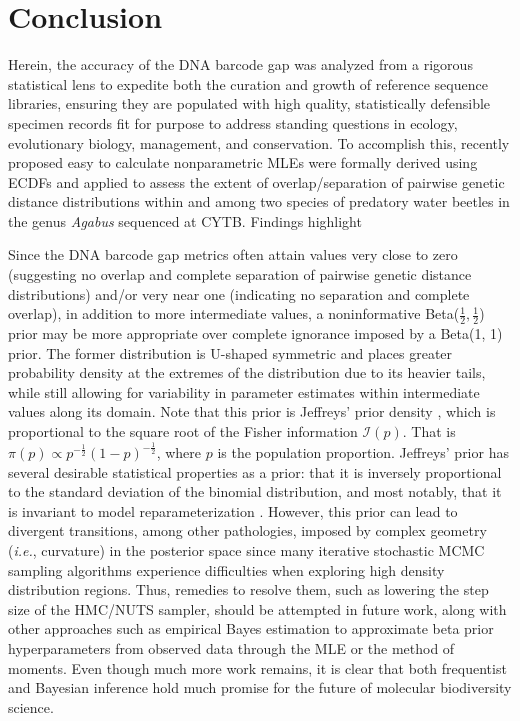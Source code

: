 \documentclass[12pt]{article}
\begin{document}
\section{Conclusion}

Herein, the accuracy of the DNA barcode gap was analyzed from a rigorous statistical lens to expedite both the curation and growth of reference sequence libraries, ensuring they are populated with high quality, statistically defensible specimen records fit for purpose to address standing questions in ecology, evolutionary biology, management, and conservation. To accomplish this, recently proposed easy to calculate nonparametric MLEs were formally derived using ECDFs and applied to assess the extent of overlap/separation of pairwise genetic distance distributions within and among two species of predatory water beetles in the genus \textit{Agabus} sequenced at CYTB. Findings highlight 

Since the DNA barcode gap metrics often attain values very close to zero (suggesting no overlap and complete separation of pairwise genetic distance distributions) and/or very near one (indicating no separation and complete overlap), in addition to more intermediate values, a noninformative Beta($\frac{1}{2}, \frac{1}{2}$) prior may be more appropriate over complete ignorance imposed by a Beta(1, 1) prior. The former distribution is U-shaped symmetric and places greater probability density at the extremes of the distribution due to its heavier tails, while still allowing for variability in parameter estimates within intermediate values along its domain. Note that this prior is Jeffreys' prior density \citep{jeffreys1946invariant}, which is  proportional to the square root of the Fisher information $\mathcal{I}(p)$. That is
$\pi(p) \propto p^{-\frac{1}{2}}(1-p)^{-\frac{1}{2}}$, where $p$ is the population proportion. Jeffreys' prior has several desirable statistical  properties as a prior: that it is inversely proportional to the standard deviation of the binomial distribution, and most notably, that it is invariant to model reparameterization \citep{gelman2014bayesian}. However, this prior can lead to divergent transitions, among other pathologies, imposed by complex geometry (\textit{i.e.}, curvature) in the posterior space since many iterative stochastic MCMC sampling algorithms experience difficulties when exploring high density distribution regions. Thus, remedies to resolve them, such as lowering the step size of the HMC/NUTS sampler, should be attempted in future work, along with other approaches such as empirical Bayes estimation to approximate beta prior hyperparameters from observed data through the MLE or the method of moments. Even though much more work remains, it is clear that both frequentist and Bayesian inference hold much promise for the future of molecular biodiversity science.
\end{document}
